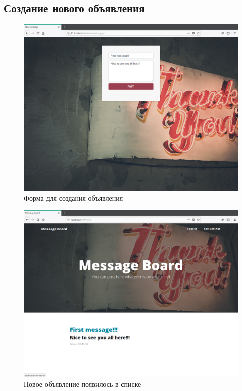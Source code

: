 \documentclass{article}
\begin{document}
    \subsection{Создание нового объявления}
    \begin{figure}[H]
        \begin{flushleft}
            \centerline{\includegraphics[scale=0.4]{newmessage.png}}
            \caption{Форма для создания объявления}
        \end{flushleft}
    \end{figure}

    \begin{figure}[H]
        \begin{flushleft}
            \centerline{\includegraphics[scale=0.4]{user.png}}
            \caption{Новое объявление появилось в списке}
        \end{flushleft}
    \end{figure}
\end{document}
